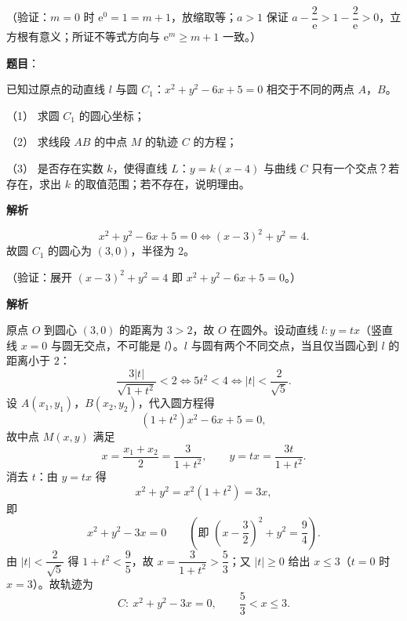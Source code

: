\begin{answer}
（验证：\(m=0\) 时 \(\mathrm{e}^0=1=m+1\)，放缩取等；\(a>1\) 保证 \(a-\dfrac{2}{\mathrm{e}}>1-\dfrac{2}{\mathrm{e}}>0\)，立方根有意义；所证不等式方向与 \(\mathrm{e}^m\geqslant m+1\) 一致。）




\end{answer}
\begin{answer}

\textbf{题目}：

已知过原点的动直线 \(l\) 与圆 \(C_1\)：\(x^2+y^2-6x+5=0\) 相交于不同的两点 \(A\)，\(B\)。

（1） 求圆 \(C_1\) 的圆心坐标；

（2） 求线段 \(AB\) 的中点 \(M\) 的轨迹 \(C\) 的方程；

（3） 是否存在实数 \(k\)，使得直线 \(L\)：\(y=k(x-4)\) 与曲线 \(C\) 只有一个交点？若存在，求出 \(k\) 的取值范围；若不存在，说明理由。

\textbf{解析}


\nopagebreak[4]
\[
x^2+y^2-6x+5=0
\iff (x-3)^2+y^2=4.
\]
故圆 \(C_1\) 的圆心为 \((3,0)\)，半径为 \(2\)。

（验证：展开 \((x-3)^2+y^2=4\) 即 \(x^2+y^2-6x+5=0\)。）


\textbf{解析}

原点 \(O\) 到圆心 \((3,0)\) 的距离为 \(3>2\)，故 \(O\) 在圆外。设动直线 \(l:y=tx\)（竖直线 \(x=0\) 与圆无交点，不可能是 \(l\)）。\(l\) 与圆有两个不同交点，当且仅当圆心到 \(l\) 的距离小于 \(2\)：
\nopagebreak[4]
\[
\frac{3|t|}{\sqrt{1+t^2}}<2
\iff 5t^2<4
\iff |t|<\frac{2}{\sqrt5}.
\]
设 \(A(x_1,y_1)\)，\(B(x_2,y_2)\)，代入圆方程得
\nopagebreak[4]
\[
(1+t^2)x^2-6x+5=0,
\]
故中点 \(M(x,y)\) 满足
\nopagebreak[4]
\[
x=\frac{x_1+x_2}{2}=\frac{3}{1+t^2},\qquad
y=tx=\frac{3t}{1+t^2}.
\]
消去 \(t\)：由 \(y=tx\) 得
\nopagebreak[4]
\[
x^2+y^2=x^2(1+t^2)=3x,
\]
即
\nopagebreak[4]
\[
x^2+y^2-3x=0
\qquad\left(\text{即 }\left(x-\frac32\right)^2+y^2=\frac94\right).
\]
由 \(|t|<\dfrac{2}{\sqrt5}\) 得 \(1+t^2<\dfrac95\)，故 \(x=\dfrac{3}{1+t^2}>\dfrac53\)；又 \(|t|\geqslant0\) 给出 \(x\leqslant3\)（\(t=0\) 时 \(x=3\)）。故轨迹为
\nopagebreak[4]
\[
C:\ x^2+y^2-3x=0,\qquad \frac53<x\leqslant3.
\]


\end{answer}
